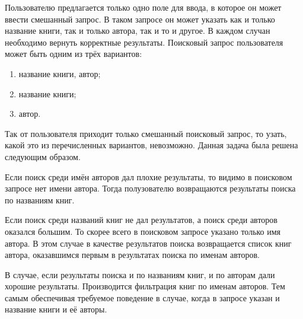 Пользователю предлагается только одно поле для ввода, в которое он может ввести смешанный запрос.
В таком запросе он может указать как и только название книги, так и только автора, так и то и другое.
В каждом случан необходимо вернуть корректные результаты.
Поисковый запрос пользователя может быть одним из трёх вариантов:
\begin{enumerate}
	\item название книги, автор;
	\item название книги;
	\item автор.
\end{enumerate}
Так от пользователя приходит только смешанный поисковый запрос, то узать, какой это из перечисленных вариантов, невозможно.
Данная задача была решена следующим образом.

Если поиск среди имён авторов дал плохие результаты, то видимо в поисковом запросе нет имени автора. Тогда полузователю возвращаются результаты поиска по названиям книг.

Если поиск среди названий книг не дал результатов, а поиск среди авторов оказался большим. То скорее всего в поисковом запросе указано только имя автора.
В этом случае в качестве результатов поиска возвращается список книг автора, оказавшимся первым в результатах поиска по именам авторов.

В случае, если результаты поиска и по названиям книг, и по авторам дали хорошие результаты. Производится фильтрация книг по именам авторов.
Тем самым обеспечивая требуемое поведение в случае, когда в запросе указан и название книги и её авторы.






